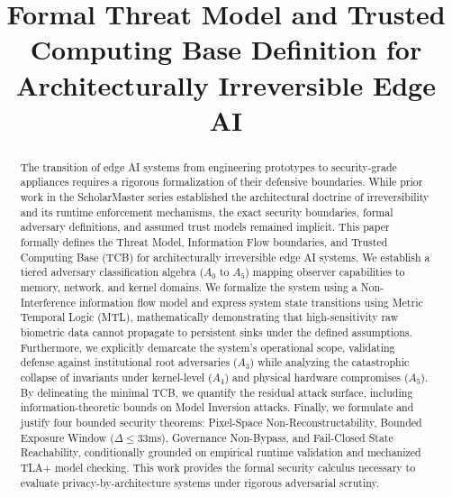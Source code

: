 \documentclass[conference]{IEEEtran}
\begin{document}
\title{Formal Threat Model and Trusted Computing Base Definition for Architecturally Irreversible Edge AI}

\author{
}

\maketitle

\begin{abstract}
The transition of edge AI systems from engineering prototypes to security-grade appliances requires a rigorous formalization of their defensive boundaries. While prior work in the ScholarMaster series established the architectural doctrine of irreversibility and its runtime enforcement mechanisms, the exact security boundaries, formal adversary definitions, and assumed trust models remained implicit. This paper formally defines the Threat Model, Information Flow boundaries, and Trusted Computing Base (TCB) for architecturally irreversible edge AI systems. We establish a tiered adversary classification algebra ($A_0$ to $A_5$) mapping observer capabilities to memory, network, and kernel domains. We formalize the system using a Non-Interference information flow model and express system state transitions using Metric Temporal Logic (MTL), mathematically demonstrating that high-sensitivity raw biometric data cannot propagate to persistent sinks under the defined assumptions. Furthermore, we explicitly demarcate the system's operational scope, validating defense against institutional root adversaries ($A_3$) while analyzing the catastrophic collapse of invariants under kernel-level ($A_4$) and physical hardware compromises ($A_5$). By delineating the minimal TCB, we quantify the residual attack surface, including information-theoretic bounds on Model Inversion attacks. Finally, we formulate and justify four bounded security theorems: Pixel-Space Non-Reconstructability, Bounded Exposure Window ($\Delta \le 33$ms), Governance Non-Bypass, and Fail-Closed State Reachability, conditionally grounded on empirical runtime validation and mechanized TLA+ model checking. This work provides the formal security calculus necessary to evaluate privacy-by-architecture systems under rigorous adversarial scrutiny.
\end{abstract}
\end{document}
